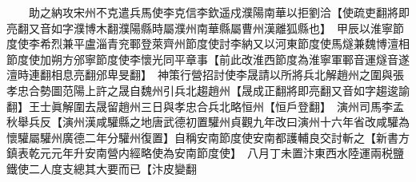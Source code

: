 　　助之納攻宋州不克遣兵馬使李克信李欽遥戍濮陽南華以拒劉洽【使疏吏翻將即亮翻又音如字濮博木翻濮陽縣時屬濮州南華縣屬曹州漢離狐縣也】　甲辰以淮寧節度使李希烈兼平盧淄青兖鄆登萊齊州節度使討李納又以河東節度使馬燧兼魏博澶相節度使加朔方邠寧節度使李懷光同平章事【前此改淮西節度為淮寧軍鄆音運燧音遂澶時連翻相息亮翻邠卑旻翻】　神策行營招討使李晟請以所將兵北解趙州之圍與張孝忠合勢圖范陽上許之晟自魏州引兵北趨趙州【晟成正翻將即亮翻又音如字趨逡諭翻】王士眞解圍去晟留趙州三日與孝忠合兵北略恒州【恒戶登翻】　演州司馬李孟秋舉兵反【演州漢咸驩縣之地唐武德初置驩州貞觀九年改曰演州十六年省改咸驩為懷驩屬驩州廣德二年分驩州復置】自稱安南節度使安南都護輔良交討斬之【新書方鎮表乾元元年升安南營内經略使為安南節度使】　八月丁未置汴東西水陸運兩税鹽鐵使二人度支總其大要而已【汴皮變翻